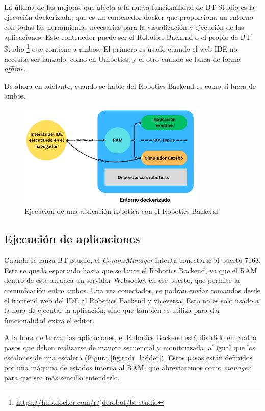 La última de las mejoras que afecta a la nueva funcionalidad de BT Studio es la ejecución dockerizada, que es un contenedor docker que proporciona un entorno con todas las herramientas necesarias para la visualización y ejecución de las aplicaciones. Este contenedor puede ser el Robotics Backend o el propio de BT Studio \footnote{\url{https://hub.docker.com/r/jderobot/bt-studio}} que contiene a ambos. El primero es usado cuando el web IDE no necesita ser lanzado, como en Unibotics, y el otro cuando se lanza de forma \textit{offline}.

De ahora en adelante, cuando se hable del Robotics Backend es como si fuera de ambos.

\begin{figure}[H]
    \centering
    \includegraphics[width=0.8\textwidth]{figures/bt-studio/docker_exec_detail.png}
    \caption{Ejecución de una aplicación robótica con el Robotics Backend}
    \label{fig:ejemplo}
\end{figure}

\subsection{Ejecución de aplicaciones}\label{sec:conex}

Cuando se lanza BT Studio, el \textit{CommsManager} intenta conectarse al puerto 7163. Este se queda esperando hasta que se lance el Robotics Backend, ya que el RAM dentro de este arranca un servidor Websocket en ese puerto, que permite la comunicación entre ambos. Una vez conectados, se podrán enviar comandos desde el frontend web del IDE al Robotics Backend y viceversa. Esto no es solo usado a la hora de ejecutar la aplicación, sino que también se utiliza para dar funcionalidad extra el editor.

A la hora de lanzar las aplicaciones, el Robotics Backend está dividido en cuatro pasos que deben realizarse de manera secuencial y monitorizada, al igual que los escalones de una escalera (Figura \ref{fig:radi_ladder}). Estos pasos están definidos por una máquina de estados interna al RAM, que abreviaremos como \textit{manager} para que sea más sencillo entenderlo.  

